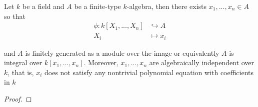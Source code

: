 \begin{theorem}
	Let $k$ be a field and $A$ be a finite-type $k$-algebra, then there exists $x_1, ..., x_n \in A$ so that
	\begin{align*}
		\phi: k[X_1, ..., X_n] &\hookrightarrow A \\
		X_i &\mapsto x_i
	\end{align*}
	
	and $A$ is finitely generated as a module over the image or equivalently $A$ is integral over $k[x_1, ..., x_n]$. Moreover, $x_1, ..., x_n$ are algebraically independent over $k$, that is, $x_i$ does not satisfy any nontrivial polynomial equation with coefficients in $k$
\end{theorem}

\begin{proof}
\end{proof}

